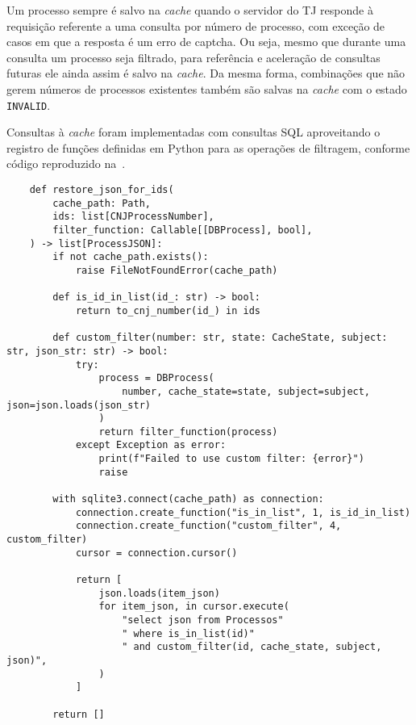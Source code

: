 Um processo sempre é salvo na \textit{cache} quando o servidor do TJ responde à
requisição referente a uma consulta por número de processo, com exceção de
casos em que a resposta é um erro de captcha. Ou seja, mesmo que durante uma
consulta um processo seja filtrado, para referência e aceleração de consultas
futuras ele ainda assim é salvo na \textit{cache}. Da mesma forma, combinações
que não gerem números de processos existentes também são salvas na
\textit{cache} com o estado \texttt{INVALID}.

Consultas à \textit{cache} foram implementadas com consultas SQL aproveitando o
registro de funções definidas em Python para as operações de filtragem,
conforme código reproduzido na~.

\begin{listing}[htb]
    \tiny
    \centering
    \begin{verbatim}
    def restore_json_for_ids(
        cache_path: Path,
        ids: list[CNJProcessNumber],
        filter_function: Callable[[DBProcess], bool],
    ) -> list[ProcessJSON]:
        if not cache_path.exists():
            raise FileNotFoundError(cache_path)

        def is_id_in_list(id_: str) -> bool:
            return to_cnj_number(id_) in ids

        def custom_filter(number: str, state: CacheState, subject: str, json_str: str) -> bool:
            try:
                process = DBProcess(
                    number, cache_state=state, subject=subject, json=json.loads(json_str)
                )
                return filter_function(process)
            except Exception as error:
                print(f"Failed to use custom filter: {error}")
                raise

        with sqlite3.connect(cache_path) as connection:
            connection.create_function("is_in_list", 1, is_id_in_list)
            connection.create_function("custom_filter", 4, custom_filter)
            cursor = connection.cursor()

            return [
                json.loads(item_json)
                for item_json, in cursor.execute(
                    "select json from Processos"
                    " where is_in_list(id)"
                    " and custom_filter(id, cache_state, subject, json)",
                )
            ]

        return []
    \end{verbatim}
    \caption{%
        Reprodução do código de restauração dos dados de processos da
        \textit{cache} a partir de filtros personalizados.
    }
    \label{cod:restauração-dados-processos-cache}
\end{listing}

%
%

